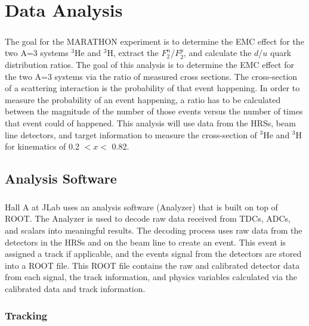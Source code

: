 \chapter{Data Analysis}
\paragraph{}The goal for the MARATHON experiment is to determine the EMC effect for the two A=3 systems $^3$He and $^3$H, extract the  $F_2^n$/$F_2^p$, and calculate the $d$/$u$ quark distribution ratios. The goal of this analysis is to determine the EMC effect for the two A=3 systems via the ratio of measured cross sections. The cross-section of a scattering interaction is the probability of that event happening. In order to measure the probability of an event happening, a ratio has to be calculated between the magnitude of the number of those events versus the number of times that event could of happened. This analysis will use data from the HRSs, beam line detectors, and target information to measure the cross-section of $^3$He and $^3$H for kinematics of 0.2 $< x <$ 0.82. 
\section{Analysis Software}
\paragraph{}Hall A at JLab uses an analysis software (Analyzer) that is built on top of ROOT. The Analyzer is used to decode raw data received from TDCs, ADCs, and scalars into meaningful results. The decoding process uses raw data from the detectors in the HRSs and on the beam line to create an event. This event is assigned a track if applicable, and the events signal from the detectors are stored into a ROOT file. This ROOT file contains the raw and calibrated detector data from each signal, the track information, and physics variables calculated via the calibrated data and track information. 
\subsection{Tracking}
